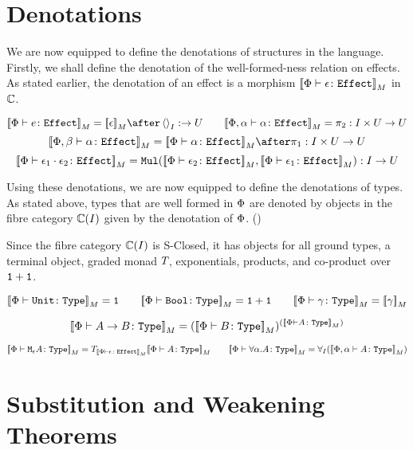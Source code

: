 \documentclass{Report}
\begin{document}
\section{Denotations}
We are now equipped to define the denotations of structures in the language. Firstly, we shall define the denotation of the well-formed-ness relation on effects. As stated earlier, the denotation of an effect is a morphism $\deno{\typerelation{\P}{\e}{\effect}}$ in $\C$.

\[
    \deno{\typerelation{\P}{e}{\effect}} = \deno{\e} \after \term{I}: \rightarrow U
    \quad\quad
    \deno{\typerelation{\P,\a}{\a}{\effect}} = \pp: I\times U \rightarrow U
\]\[
    \deno{\typerelation{\P, \b}{\a}{\effect}} = \deno{\typerelation{\P}{\a}{\effect}}\after\p: I\times U\rightarrow U
\]\[
    \deno{\typerelation{\P}{\e_1\dot \e_2}{\effect}} = \Mul(\deno{\typerelation{\P}{\e_2}{\effect}},\deno{\typerelation{\P}{\e_1}{\effect}}): I \rightarrow U
\]

Using these denotations, we are now equipped to define the denotations of types. As stated above, types that are well formed in $\P$ are denoted by objects in the fibre category $\C(I)$ given by the denotation of $\P$. () 

Since the fibre category $\C(I)$ is S-Closed, it has objects for all ground types, a terminal object, graded monad $\T{}{}$, exponentials, products, and co-product over $\1+\1$.

\[
    \deno{\typerelation{\P}{\U}{\type}} = \1
    \quad\quad
    \deno{\typerelation{\P}{\B}{\type}} = \1+\1
    \quad\quad
    \deno{\typerelation{\P}{\g}{\type}} = \deno{\g}
\] 

\[
    \deno{\typerelation{\P}{\ab}{\type}} = (\deno{\typerelation{\P}{B}{\type}})^{(\deno{\typerelation{\P}{A}{\type}})}
\]

\[
    \deno{\typerelation{\P}{\mea}{\type}} =\T{\deno{\typerelation{\P}{\e}{\effect}}}{\deno{\typerelation{\P}{A}{\type}}}
    \quad\quad
    \deno{\typerelation{\P}{\all{\a}{A}}{\type}} =\allI(\deno{\typerelation{\P,\a}{A}{\type}})
\]


\section{Substitution and Weakening Theorems}
\end{document}
